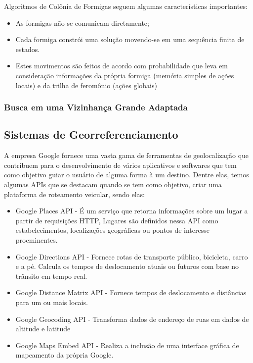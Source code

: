 Algoritmos de Colônia de Formigas seguem algumas características importantes:
\begin{itemize}
    \item As formigas não se comunicam diretamente;
    \item Cada formiga constrói uma solução movendo-se em uma sequência finita de estados.
    \item Estes movimentos são feitos de acordo com probabilidade que leva em consideração informações da própria formiga (memória simples de ações locais) e da trilha de feromônio (ações globais)
\end{itemize}



\subsubsection{Busca em uma Vizinhança Grande Adaptada}

\subsection{Sistemas de Georreferenciamento}\label{georreferenciamento}
A empresa Google fornece uma vasta gama de ferramentas de geolocalização que contribuem para o desenvolvimento de vários aplicativos e softwares que tem como objetivo guiar o usuário de alguma forma à um destino. Dentre elas, temos algumas APIs que se destacam quando se tem como objetivo, criar uma plataforma de roteamento veicular, sendo elas:
\begin{itemize}
    \item Google Places API - É um serviço que retorna informações sobre um lugar a partir de requisições HTTP, Lugares são definidos nessa API como estabelecimentos, localizações geográficas ou pontos de interesse proeminentes.
    
    \item Google Directions API - Fornece rotas de transporte público, bicicleta, carro e a pé. Calcula os tempos de deslocamento atuais ou futuros com base no trânsito em tempo real.
    
    \item Google Distance Matrix API - Fornece tempos de deslocamento e distâncias para um ou mais locais.
    
    \item Google Geocoding API - Transforma dados de endereço de ruas em dados de altitude e latitude
    
    \item Google Maps Embed API - Realiza a inclusão de uma interface gráfica de mapeamento da própria Google.

\end{itemize}

